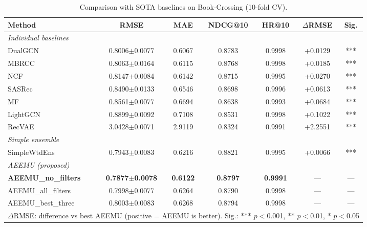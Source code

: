 \begin{table}[htbp]
\centering
\caption{Comparison with SOTA baselines on Book-Crossing (10-fold CV).}
\label{tab:sota-book-crossing}
\begin{adjustbox}{max width=\textwidth}
\begin{tabular}{l ccc cc c}
\toprule
\textbf{Method} & \textbf{RMSE} & \textbf{MAE} & \textbf{NDCG@10} & \textbf{HR@10} & \textbf{$\Delta$RMSE} & \textbf{Sig.} \\
\midrule
\multicolumn{7}{l}{\textit{Individual baselines}} \\
DualGCN & 0.8006$\pm$0.0077 & 0.6067 & 0.8783 & 0.9998 & +0.0129 & *** \\
MBRCC & 0.8063$\pm$0.0164 & 0.6115 & 0.8768 & 0.9998 & +0.0185 & *** \\
NCF & 0.8147$\pm$0.0084 & 0.6142 & 0.8715 & 0.9995 & +0.0270 & *** \\
SASRec & 0.8490$\pm$0.0133 & 0.6546 & 0.8698 & 0.9996 & +0.0613 & *** \\
MF & 0.8561$\pm$0.0077 & 0.6694 & 0.8638 & 0.9993 & +0.0684 & *** \\
LightGCN & 0.8899$\pm$0.0092 & 0.7108 & 0.8531 & 0.9998 & +0.1022 & *** \\
RecVAE & 3.0428$\pm$0.0071 & 2.9119 & 0.8324 & 0.9991 & +2.2551 & *** \\
\midrule
\multicolumn{7}{l}{\textit{Simple ensemble}} \\
SimpleWtdEns & 0.7943$\pm$0.0083 & 0.6216 & 0.8821 & 0.9995 & +0.0066 & *** \\
\midrule
\multicolumn{7}{l}{\textit{AEEMU (proposed)}} \\
\textbf{AEEMU\_no\_filters} & \textbf{0.7877$\pm$0.0078} & \textbf{0.6122} & \textbf{0.8797} & \textbf{0.9991} & --- & --- \\
AEEMU\_all\_filters & 0.7998$\pm$0.0077 & 0.6264 & 0.8790 & 0.9998 & --- & --- \\
AEEMU\_best\_three & 0.8003$\pm$0.0083 & 0.6268 & 0.8794 & 0.9998 & --- & --- \\
\bottomrule
\multicolumn{7}{l}{\footnotesize $\Delta$RMSE: difference vs best AEEMU (positive = AEEMU is better). Sig.: *** $p<$0.001, ** $p<$0.01, * $p<$0.05} \\
\end{tabular}
\end{adjustbox}
\end{table}